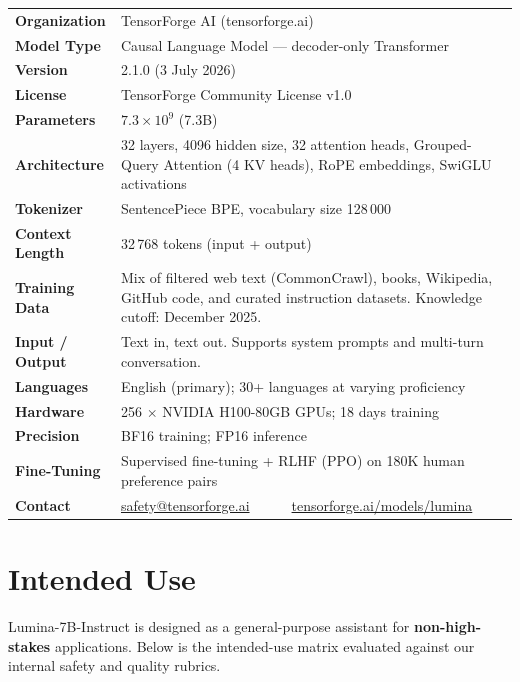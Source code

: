 \documentclass[11pt,a4paper]{article}
\newcommand{\detailrow}[2]{%
  \textcolor{accent}{\bfseries\small #1} & {\small #2} \\[3pt]}
\begin{document}
\begin{tabularx}{\linewidth}{@{}>{\color{accent}\bfseries\small}l@{\hspace{7mm}}>{\raggedright\arraybackslash\small}X@{}}
  \detailrow{Organization}{TensorForge AI (tensorforge.ai)}
  \detailrow{Model Type}{Causal Language Model — decoder-only Transformer}
  \detailrow{Version}{2.1.0 (3 July 2026)}
  \detailrow{License}{TensorForge Community License v1.0}
  \detailrow{Parameters}{$7.3\times 10^{9}$ (7.3B)}
  \detailrow{Architecture}{32 layers, 4096 hidden size, 32 attention heads, Grouped-Query Attention (4 KV heads), RoPE embeddings, SwiGLU activations}
  \detailrow{Tokenizer}{SentencePiece BPE, vocabulary size 128\,000}
  \detailrow{Context Length}{32\,768 tokens (input + output)}
  \detailrow{Training Data}{Mix of filtered web text (CommonCrawl), books, Wikipedia, GitHub code, and curated instruction datasets. Knowledge cutoff: December 2025.}
  \detailrow{Input / Output}{Text in, text out. Supports system prompts and multi-turn conversation.}
  \detailrow{Languages}{English (primary); 30+ languages at varying proficiency}
  \detailrow{Hardware}{256 $\times$ NVIDIA H100-80GB GPUs; 18 days training}
  \detailrow{Precision}{BF16 training; FP16 inference}
  \detailrow{Fine-Tuning}{Supervised fine-tuning + RLHF (PPO) on 180K human preference pairs}
  \detailrow{Contact}{\href{mailto:safety@tensorforge.ai}{safety@tensorforge.ai}~~~\textbullet~~~\href{https://tensorforge.ai/models/lumina}{tensorforge.ai/models/lumina}}
\end{tabularx}

\section{Intended Use}

Lumina-7B-Instruct is designed as a general-purpose assistant for
\textbf{non-high-stakes} applications. Below is the intended-use matrix
evaluated against our internal safety and quality rubrics.

\vspace{6pt}
\end{document}

